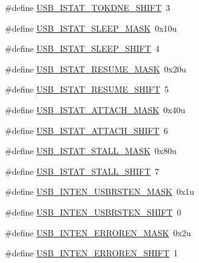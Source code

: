 \begin{DoxyCompactItemize}
\item 
\#define \hyperlink{group___u_s_b___register___masks_ga55bb01da118027c84423bfcb317eabb5}{U\+S\+B\+\_\+\+I\+S\+T\+A\+T\+\_\+\+T\+O\+K\+D\+N\+E\+\_\+\+S\+H\+I\+FT}~3
\item 
\#define \hyperlink{group___u_s_b___register___masks_ga008ba082c8646490852ad753ebcf4e62}{U\+S\+B\+\_\+\+I\+S\+T\+A\+T\+\_\+\+S\+L\+E\+E\+P\+\_\+\+M\+A\+SK}~0x10u
\item 
\#define \hyperlink{group___u_s_b___register___masks_ga724873614965bae7c2d6c45aa4731f70}{U\+S\+B\+\_\+\+I\+S\+T\+A\+T\+\_\+\+S\+L\+E\+E\+P\+\_\+\+S\+H\+I\+FT}~4
\item 
\#define \hyperlink{group___u_s_b___register___masks_ga072350db0370ccd930e192c850ef52d9}{U\+S\+B\+\_\+\+I\+S\+T\+A\+T\+\_\+\+R\+E\+S\+U\+M\+E\+\_\+\+M\+A\+SK}~0x20u
\item 
\#define \hyperlink{group___u_s_b___register___masks_gadf654883244211ef077839ab67084069}{U\+S\+B\+\_\+\+I\+S\+T\+A\+T\+\_\+\+R\+E\+S\+U\+M\+E\+\_\+\+S\+H\+I\+FT}~5
\item 
\#define \hyperlink{group___u_s_b___register___masks_gaad79229bb3a2c9199b50a86a8f4c49fa}{U\+S\+B\+\_\+\+I\+S\+T\+A\+T\+\_\+\+A\+T\+T\+A\+C\+H\+\_\+\+M\+A\+SK}~0x40u
\item 
\#define \hyperlink{group___u_s_b___register___masks_ga7820c4cabf21bbbab066e4db9f2bb4b1}{U\+S\+B\+\_\+\+I\+S\+T\+A\+T\+\_\+\+A\+T\+T\+A\+C\+H\+\_\+\+S\+H\+I\+FT}~6
\item 
\#define \hyperlink{group___u_s_b___register___masks_gaab3ce766c4d9a80eaddf42589789ab2d}{U\+S\+B\+\_\+\+I\+S\+T\+A\+T\+\_\+\+S\+T\+A\+L\+L\+\_\+\+M\+A\+SK}~0x80u
\item 
\#define \hyperlink{group___u_s_b___register___masks_ga02df98ee1c82991ef063f89d4ef6ce2b}{U\+S\+B\+\_\+\+I\+S\+T\+A\+T\+\_\+\+S\+T\+A\+L\+L\+\_\+\+S\+H\+I\+FT}~7
\item 
\#define \hyperlink{group___u_s_b___register___masks_ga67ed1b19b1fe4e25fc5ccf7bf0d42c38}{U\+S\+B\+\_\+\+I\+N\+T\+E\+N\+\_\+\+U\+S\+B\+R\+S\+T\+E\+N\+\_\+\+M\+A\+SK}~0x1u
\item 
\#define \hyperlink{group___u_s_b___register___masks_gaf3b53207fe24da42d123d8e94494b72f}{U\+S\+B\+\_\+\+I\+N\+T\+E\+N\+\_\+\+U\+S\+B\+R\+S\+T\+E\+N\+\_\+\+S\+H\+I\+FT}~0
\item 
\#define \hyperlink{group___u_s_b___register___masks_gaf660b76755baff6ed122be3eba21723b}{U\+S\+B\+\_\+\+I\+N\+T\+E\+N\+\_\+\+E\+R\+R\+O\+R\+E\+N\+\_\+\+M\+A\+SK}~0x2u
\item 
\#define \hyperlink{group___u_s_b___register___masks_ga38c74121b3660065935c4f639f987b3c}{U\+S\+B\+\_\+\+I\+N\+T\+E\+N\+\_\+\+E\+R\+R\+O\+R\+E\+N\+\_\+\+S\+H\+I\+FT}~1

\end{DoxyCompactItemize}
